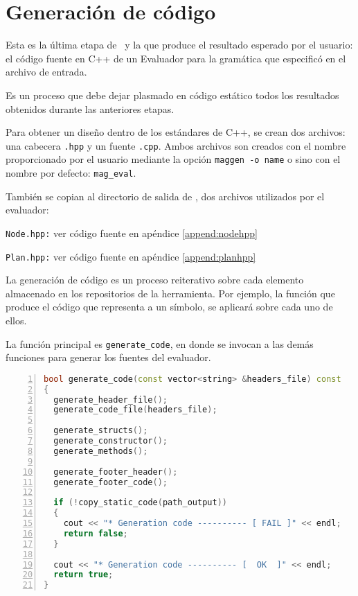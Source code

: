 \section{Generación de código}

Esta es la última etapa de \maggen\ y la que produce el resultado esperado por el usuario: el código fuente en C++ de un Evaluador para la gramática que especificó en el archivo de entrada.

Es un proceso que debe dejar plasmado en código estático todos los resultados obtenidos durante las anteriores etapas.

Para obtener un diseño dentro de los estándares de C++, se crean dos archivos: una cabecera \texttt{.hpp} y un fuente \texttt{.cpp}. Ambos archivos son creados con el nombre proporcionado por el usuario mediante la opción \texttt{maggen -o name} o sino con el nombre por defecto: \texttt{mag\_eval}.

También se copian al directorio de salida de \maggen, dos archivos utilizados por el evaluador:
\begin{items}
\item \texttt{Node.hpp:} ver código fuente en apéndice \ref{append:nodehpp}
\item \texttt{Plan.hpp:} ver código fuente en apéndice \ref{append:planhpp}
\end{items}

\vspace*{0.2cm}

La generación de código es un proceso reiterativo sobre cada elemento almacenado en los repositorios de la herramienta. Por ejemplo, la función que produce el código que representa a un símbolo, se aplicará sobre cada uno de ellos.

La función principal es \texttt{generate\_code}, en donde se invocan a las demás funciones para generar los fuentes del evaluador.

\vspace*{0.2cm}

\begin{lstlisting}[language=C++, basicstyle=\scriptsize, numbers=left, columns=fullflexible, linewidth=10cm]
bool generate_code(const vector<string> &headers_file) const
{
  generate_header_file();
  generate_code_file(headers_file);

  generate_structs();
  generate_constructor();
  generate_methods();

  generate_footer_header();
  generate_footer_code();

  if (!copy_static_code(path_output))
  {
    cout << "* Generation code ---------- [ FAIL ]" << endl;
    return false;
  }

  cout << "* Generation code ---------- [  OK  ]" << endl;
  return true;
}
\end{lstlisting}

